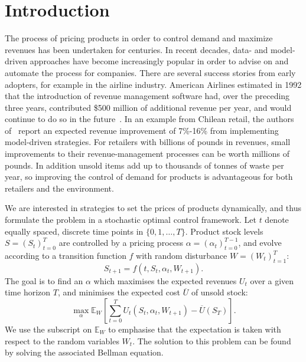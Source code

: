 \documentclass[main.tex]{subfiles}
\begin{document}
\listoftodos

\section{Introduction}
The process of pricing products in order to control demand and
maximize revenues has been undertaken for centuries. In recent
decades, data- and model-driven approaches have become increasingly
popular in order to advise on and automate the process for companies.
There are several success stories from early adopters, for example in
the airline industry.
American Airlines estimated in 1992 that the introduction of revenue
management software had, over the preceding three
years, contributed \$500 million of additional revenue per year,
and would continue to do so in the future~\cite{smith1992yield}.
In an example from Chilean retail, the authors of~\cite{bitran1998coordinating}
report an expected revenue improvement of 7\%-16\% from implementing
model-driven strategies.
For retailers with billions of pounds in revenues, small
improvements to their revenue-management processes can be worth millions
of pounds.
In addition unsold items add up to thousands of tonnes of waste per year, so
improving the control of demand for products is advantageous
for both retailers and the environment.

We are interested in strategies to  set the prices of
products dynamically, and thus
formulate the problem in a stochastic optimal control framework.
Let $t$ denote equally spaced, discrete time points in $\{0,1,\dots,T\}$.
Product stock levels $S={(S_t)}_{t=0}^T$ are controlled by a pricing process
$\alpha={(\alpha_t)}_{t=0}^{T-1}$, and evolve according to a transition function $f$ with random disturbance
$W={(W_t)}_{t=1}^T$:
\begin{equation}
  S_{t+1}=f(t,S_t,\alpha_t,W_{t+1}).
\end{equation}
The goal is to find an $\alpha$ which maximises the expected revenues $U_t$ over a
given time horizon $T$, and
minimises the expected cost $\overline{U}$ of unsold stock:
\begin{equation}
  \max_{\alpha}\mathbb E_W\left[ \sum_{t=0}^TU_t(S_t,\alpha_t,W_{t+1})
    - \overline{U}(S_T)\right].
\end{equation}
We use the subscript on $\mathbb E_W$ to emphasise that the
expectation is taken with respect to the random variables $W_t$.
The solution to this problem can be found by solving the associated
Bellman equation.
\end{document}
